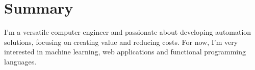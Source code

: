 \documentclass[letterpaper]{twentysecondcv} %
\begin{document}




        



\makeprofile %


\section{Summary}

I'm a versatile computer engineer and passionate about developing automation
solutions, focusing on creating value and reducing costs. For now, I'm very interested 
in machine learning, web applications and functional  programming languages.
\end{document}
